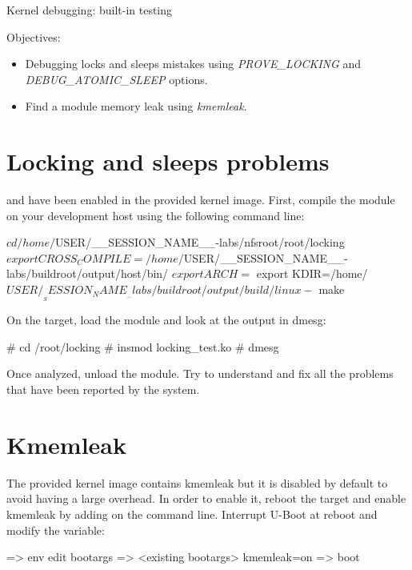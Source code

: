 \subchapter
{Kernel debugging: built-in testing}
{Objectives:
  \begin{itemize}
    \item Debugging locks and sleeps mistakes using {\em PROVE\_LOCKING} and {\em
    DEBUG\_ATOMIC\_SLEEP} options.
    \item Find a module memory leak using {\em kmemleak}.
  \end{itemize}
}

\section{Locking and sleeps problems}

 and  have been
enabled in the provided kernel image.
First, compile the module on your development host using the following command line:

\begin{bashinput}
$ cd /home/$USER/__SESSION_NAME__-labs/nfsroot/root/locking
$ export CROSS_COMPILE=/home/$USER/__SESSION_NAME__-labs/buildroot/output/host/bin/%
$ export ARCH=%
$ export KDIR=/home/$USER/__SESSION_NAME__-labs/buildroot/output/build/linux-%
$ make
\end{bashinput}

On the target, load the  module and look at the output in dmesg:

\begin{bashinput}
# cd /root/locking
# insmod locking_test.ko
# dmesg
\end{bashinput}

Once analyzed, unload the module. Try to understand and fix all the problems that
have been reported by the  system.

\section{Kmemleak}

The provided kernel image contains kmemleak but it is disabled by default to
avoid having a large overhead. In order to enable it, reboot the target and enable
kmemleak by adding  on the command line. Interrupt U-Boot at
reboot and modify the  variable:

\begin{bashinput}
=> env edit bootargs
=> <existing bootargs> kmemleak=on
=> boot
\end{bashinput}

